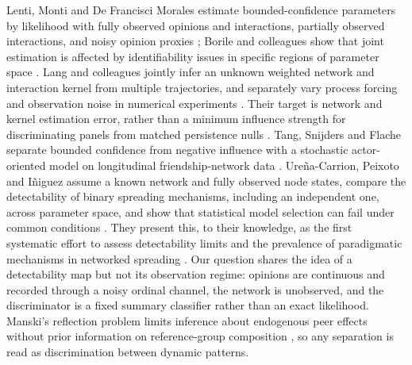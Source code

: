 Lenti, Monti and De Francisci Morales estimate bounded-confidence parameters by likelihood with fully observed opinions and interactions, partially observed interactions, and noisy opinion proxies \cite{lenti2024}; Borile and colleagues show that joint estimation is affected by identifiability issues in specific regions of parameter space \cite{borile2026}.
Lang and colleagues jointly infer an unknown weighted network and interaction kernel from multiple trajectories, and separately vary process forcing and observation noise in numerical experiments \cite{lang2026joint}.
Their target is network and kernel estimation error, rather than a minimum influence strength for discriminating panels from matched persistence nulls \cite{lang2026joint}.
Tang, Snijders and Flache separate bounded confidence from negative influence with a stochastic actor-oriented model on longitudinal friendship-network data \cite{tang2025empirical}.
Ureña-Carrion, Peixoto and Iñiguez assume a known network and fully observed node states, compare the detectability of binary spreading mechanisms, including an independent one, across parameter space, and show that statistical model selection can fail under common conditions \cite{urena2026}.
They present this, to their knowledge, as the first systematic effort to assess detectability limits and the prevalence of paradigmatic mechanisms in networked spreading \cite{urena2026}.
Our question shares the idea of a detectability map but not its observation regime: opinions are continuous and recorded through a noisy ordinal channel, the network is unobserved, and the discriminator is a fixed summary classifier rather than an exact likelihood.
Manski's reflection problem limits inference about endogenous peer effects without prior information on reference-group composition \cite{manski1993}, so any separation is read as discrimination between dynamic patterns.

